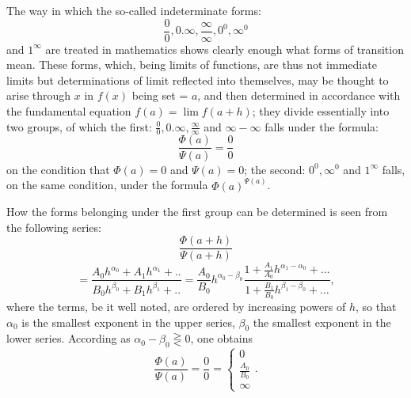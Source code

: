 \documentclass[12pt,a4paper,openany]{book}
\newcommand{\opage}[1]{\marginnote{\footnotesize\textit{[#1]}}}
\begin{document}
The way in which the so-called indeterminate forms:
\[ \frac{0}{0}, 0.\infty, \frac{\infty}{\infty}, 0^{0}, \infty^{0} \]
and $1^{\infty}$ are treated in mathematics shows clearly enough what forms of transition mean. These forms, which, being limits of functions, are thus not immediate limits but determinations of limit reflected into themselves, may be thought to arise through $x$ in $f(x)$ being set = $a$, and then determined in accordance with the fundamental equation $f(a)=\lim f(a+h)$; they divide essentially into two groups, of which the first: $\frac{0}{0}, 0.\infty, \frac{\infty}{\infty}$ and $\infty-\infty$ falls under the formula:
\[ \frac{\Phi(a)}{\Psi(a)}=\frac{0}{0} \]
on the condition that $\Phi(a)=0$ and $\Psi(a)=0$;
the second: $0^{0}, \infty^{0}$ and $1^{\infty}$ falls, on the same condition, under the formula $\Phi(a)^{\Psi(a)}$.

\setcounter{footnote}{0}%
\opage{73}How the forms belonging under the first group can be determined is seen from the following series:
\[ \frac{\Phi(a+h)}{\Psi(a+h)} \]
\[ =\frac{A_{0}h^{\alpha_{0}}+A_{1}h^{\alpha_{1}}+..}{B_{0}h^{\beta_{0}}+B_{1}h^{\beta_{1}}+..}=\frac{A_{0}}{B_{0}}h^{\alpha_{0}-\beta_{0}}\frac{1+\frac{A_{1}}{A_{0}}h^{\alpha_{1}-\alpha_{0}}+\ldots}{1+\frac{B_{1}}{B_{0}}h^{\beta_{1}-\beta_{0}}+\ldots}, \]
where the terms, be it well noted, are ordered by increasing powers of $h$, so that $\alpha_{0}$ is the smallest exponent in the upper series, $\beta_{0}$ the smallest exponent in the lower series. According as $\alpha_{0}-\beta_{0}\gtreqless 0$, one obtains
\[ \frac{\Phi(a)}{\Psi(a)}=\frac{0}{0}=\begin{cases}0\\ \frac{A_{0}}{B_{0}}\\ \infty\end{cases}. \]
\end{document}
